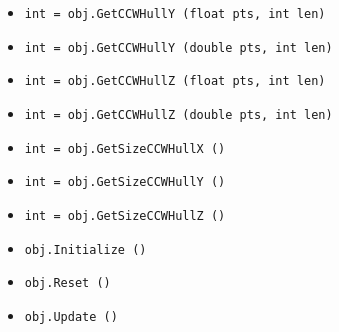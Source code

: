 \begin{itemize}
\item  \verb|int = obj.GetCCWHullY (float pts, int len)|

\item  \verb|int = obj.GetCCWHullY (double pts, int len)|

\item  \verb|int = obj.GetCCWHullZ (float pts, int len)|

\item  \verb|int = obj.GetCCWHullZ (double pts, int len)|

\item  \verb|int = obj.GetSizeCCWHullX ()|

\item  \verb|int = obj.GetSizeCCWHullY ()|

\item  \verb|int = obj.GetSizeCCWHullZ ()|

\item  \verb|obj.Initialize ()|

\item  \verb|obj.Reset ()|

\item  \verb|obj.Update ()|

\end{itemize}
